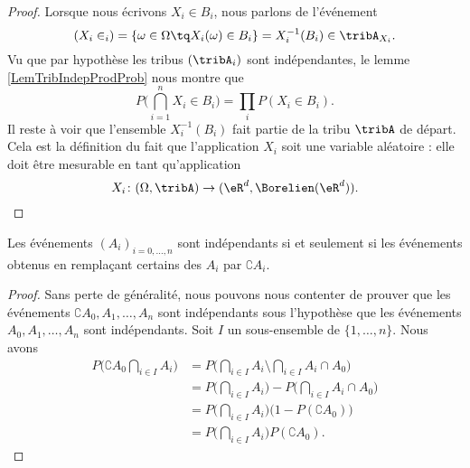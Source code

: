 \begin{proof}
    Lorsque nous écrivons \( X_i\in B_i\), nous parlons de l'événement
    \begin{equation}
        (X_i\in _i)=\{ \omega\in\Omega\tq X_i(\omega)\in B_i \}=X_i^{-1}(B_i)\in \tribA_{X_i}.
    \end{equation}
    Vu que par hypothèse les tribus \( (\tribA_i)\) sont indépendantes, le lemme \ref{LemTribIndepProdProb} nous montre que
    \begin{equation}
        P\big( \bigcap_{i=1}^nX_i\in B_i \big)=\prod_iP(X_i\in B_i).
    \end{equation}
    Il reste à voir que l'ensemble \( X_i^{-1}(B_i)\) fait partie de la tribu \( \tribA\) de départ. Cela est la définition du fait que l'application \( X_i\) soit une variable aléatoire : elle doit être mesurable en tant qu'application
    \begin{equation}
        X_i\colon (\Omega,\tribA)\to (\eR^d,\Borelien(\eR^d)).
    \end{equation}
\end{proof}

\begin{lemma}       \label{LemIndepEvenCompl}
    Les événements \( (A_i)_{i=0,\ldots,n}\) sont indépendants si et seulement si les événements obtenus en remplaçant certains des \( A_i\) par \( \complement A_i\).
\end{lemma}

\begin{proof}
    Sans perte de généralité, nous pouvons nous contenter de prouver que les événements \( \complement A_0,A_1,\ldots,A_n\) sont indépendants sous l'hypothèse que les événements \( A_0,A_1,\ldots,A_n\) sont indépendants. Soit \( I\) un sous-ensemble de \( \{ 1,\ldots,n \}\). Nous avons
    \begin{subequations}
        \begin{align}
            P\big( \complement A_0\bigcap_{i\in I}A_i \big)&=P\big( \bigcap_{i\in I}A_i\setminus\bigcap_{i\in I}A_i\cap A_0 \big)\\
            &=P\big( \bigcap_{i\in I}A_i \big)-P\big( \bigcap_{i\in I}A_i\cap A_0 \big)\\
            &=P\big( \bigcap_{i\in I}A_i \big)\big( 1-P(\complement A_0) \big)\\
            &=P\big( \bigcap_{i\in I}A_i \big)P(\complement A_0).
        \end{align}
    \end{subequations}
\end{proof}

